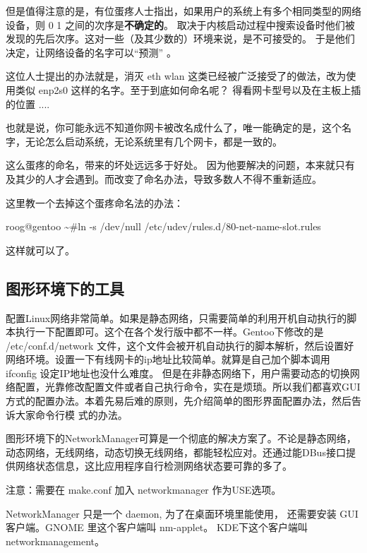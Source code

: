但是值得注意的是，有位蛋疼人士指出，如果用户的系统上有多个相同类型的网络设备，则 0 1 之间的次序是\textbf{不确定的}。 取决于内核启动过程中搜索设备时他们被发现的先后次序。这对一些（及其少数的）环境来说，是不可接受的。
于是他们决定，让网络设备的名字可以``预测'' 。

这位人士提出的办法就是，消灭 eth wlan  这类已经被广泛接受了的做法，改为使用类似 enp2s0 这样的名字。至于到底如何命名呢？ 得看网卡型号以及在主板上插的位置 ....

也就是说，你可能永远不知道你网卡被改名成什么了，唯一能确定的是，这个名字，无论怎么启动系统，无论系统里有几个网卡，都是一致的。

这么蛋疼的命名，带来的坏处远远多于好处。 因为他要解决的问题，本来就只有及其少的人才会遇到。而改变了命名办法，导致多数人不得不重新适应。

这里教一个去掉这个蛋疼命名法的办法：

\begin{code}
roog@gentoo \textasciitilde  \#ln -s /dev/null /etc/udev/rules.d/80-net-name-slot.rules
\end{code}

这样就可以了。


\subsection{图形环境下的工具}\label{sec:networkmanager}

配置Linux网络非常简单。如果是静态网络，只需要简单的利用开机自动执行的脚本执行一下配置即可。这个在各个发行版中都不一样。Gentoo下修改的是 /etc/conf.d/network 文件，这个文件会被开机自动执行的脚本解析，然后设置好网络环境。设置一下有线网卡的ip地址比较简单。就算是自己加个脚本调用 ifconfig 设定IP地址也没什么难度。
但是在非静态网络下，用户需要动态的切换网络配置，光靠修改配置文件或者自己执行命令，实在是烦琐。所以我们都喜欢GUI方式的配置办法。本着先易后难的原则，先介绍简单的图形界面配置办法，然后告诉大家命令行模
式的办法。

图形环境下的NetworkManager可算是一个彻底的解决方案了。不论是静态网络，动态网络，无线网络，动态切换无线网络，都能轻松应对。还通过能DBus接口提供网络状态信息，这比应用程序自行检测网络状态要可靠的多了。
\begin{notice}
注意：需要在 make.conf 加入 networkmanager 作为USE选项。
\end{notice}

NetworkManager 只是一个 daemon, 为了在桌面环境里能使用， 还需要安装 GUI 客户端。GNOME 里这个客户端叫 nm-applet。
KDE下这个客户端叫 networkmanagement。

